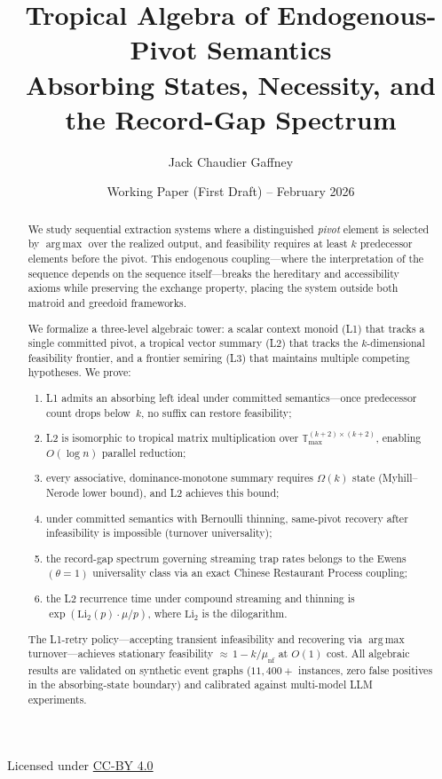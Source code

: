 \documentclass[11pt]{article}
\title{%
  \textbf{Tropical Algebra of Endogenous-Pivot Semantics}\\[6pt]
  \large Absorbing States, Necessity, and the Record-Gap Spectrum
}
\author{Jack Chaudier Gaffney}
\date{Working Paper (First Draft) -- February 2026}
\theoremstyle{plain}
\theoremstyle{definition}
\theoremstyle{remark}
\newcommand{\Tmax}{\mathbb{T}_{\max}}
\DeclareMathOperator*{\argmax}{arg\,max}
\begin{document}
\maketitle

\begin{center}
\small Licensed under \href{https://creativecommons.org/licenses/by/4.0/}{CC-BY 4.0}
\end{center}

\begin{abstract}
We study sequential extraction systems where a distinguished
\emph{pivot} element is selected by $\argmax$ over the realized output,
and feasibility requires at least $k$ predecessor elements before the
pivot.  This endogenous coupling---where the interpretation of the
sequence depends on the sequence itself---breaks the hereditary and
accessibility axioms while preserving the exchange property,
placing the system outside both matroid and greedoid frameworks.

We formalize a three-level algebraic tower: a scalar context monoid
(L1) that tracks a single committed pivot, a tropical vector summary
(L2) that tracks the $k$-dimensional feasibility frontier, and a
frontier semiring (L3) that maintains multiple competing hypotheses.
We prove:
\begin{enumerate}[label=(\roman*),nosep]
  \item L1 admits an absorbing left ideal under committed
    semantics---once predecessor count drops below~$k$, no suffix can
    restore feasibility;
  \item L2 is isomorphic to tropical matrix multiplication over
    $\Tmax^{(k{+}2)\times(k{+}2)}$, enabling $O(\log n)$ parallel
    reduction;
  \item every associative, dominance-monotone summary requires
    $\Omega(k)$ state (Myhill--Nerode lower bound), and L2 achieves
    this bound;
  \item under committed semantics with Bernoulli thinning, same-pivot
    recovery after infeasibility is impossible (turnover universality);
  \item the record-gap spectrum governing streaming trap rates belongs
    to the Ewens$(\theta{=}1)$ universality class via an exact Chinese
    Restaurant Process coupling;
  \item the L2 recurrence time under compound streaming and thinning is
    $\exp(\mathrm{Li}_2(p) \cdot \mu / p)$, where $\mathrm{Li}_2$ is
    the dilogarithm.
\end{enumerate}
The L1-retry policy---accepting transient infeasibility and recovering
via $\argmax$ turnover---achieves stationary feasibility
${\approx}\, 1 - k/\mu_{\mathrm{nf}}$ at $O(1)$ cost.  All algebraic results are
validated on synthetic event graphs ($11{,}400{+}$ instances, zero false
positives in the absorbing-state boundary) and calibrated against
multi-model LLM experiments.
\end{abstract}
\end{document}
